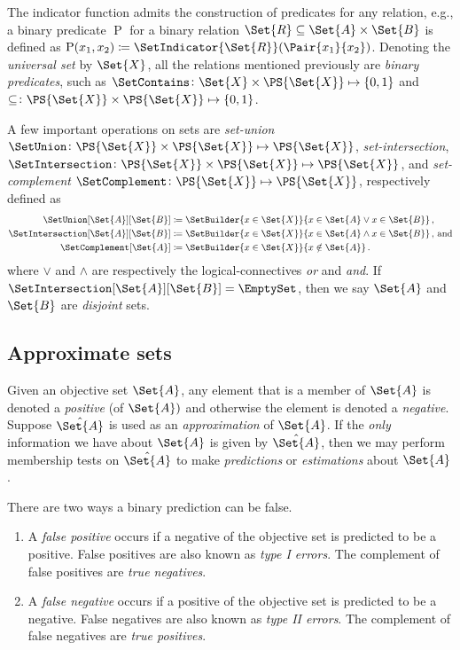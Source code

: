 \documentclass[../main.tex]{subfiles}
\begin{document}
The indicator function admits the construction of predicates for any relation, e.g., a binary predicate $\operatorname{P}$ for a binary relation $\Set{R} \subseteq \Set{A} \times \Set{B}$ is defined as $\operatorname{P}(x_1,x_2) \coloneqq \SetIndicator{\Set{R}}(\Pair{x_1}{x_2})$.
Denoting the \emph{universal set} by $\Set{X}$, all the relations mentioned previously are \emph{binary predicates}, such as $\SetContains \colon \Set{X} \times \PS{\Set{X}} \mapsto \{0,1\}$ and $\subseteq \colon \PS{\Set{X}} \times \PS{\Set{X}} \mapsto \{0,1\}$.

A few important operations on sets are \emph{set-union} $\SetUnion \colon \PS{\Set{X}} \times \PS{\Set{X}} \mapsto \PS{\Set{X}}$, \emph{set-intersection}, $\SetIntersection \colon \PS{\Set{X}} \times \PS{\Set{X}} \mapsto \PS{\Set{X}}$, and \emph{set-complement} $\SetComplement \colon \PS{\Set{X}} \mapsto \PS{\Set{X}}$, respectively defined as
\begin{align}
	\SetUnion[\Set{A}][\Set{B}]			&\coloneqq \SetBuilder{ x \in \Set{X}}{x \in \Set{A} \lor x \in \Set{B}}\,,\\
	\SetIntersection[\Set{A}][\Set{B}]	&\coloneqq \SetBuilder{ x \in \Set{X}}{x \in \Set{A} \land x \in \Set{B}}\,,\,\text{and}\\
	\SetComplement[\Set{A}]				&\coloneqq \SetBuilder{ x \in \Set{X}}{x \notin \Set{A}}\,.
\end{align}
where $\lor$ and $\land$ are respectively the logical-connectives \emph{or} and \emph{and}.
If $\SetIntersection[\Set{A}][\Set{B}] = \EmptySet$, then we say $\Set{A}$ and $\Set{B}$ are \emph{disjoint} sets.

\subsection{Approximate sets}
\label{sec:asets}
Given an objective set $\Set{A}$, any element that is a member of $\Set{A}$ is denoted a \emph{positive} (of $\Set{A})$ and otherwise the element is denoted a \emph{negative}.
Suppose $\hat{\Set{A}}$ is used as an \emph{approximation} of $\Set{A}$.
If the \emph{only} information we have about $\Set{A}$ is given by $\hat{\Set{A}}$, then we may perform membership tests on $\hat{\Set{A}}$ to make \emph{predictions} or \emph{estimations} about $\Set{A}$.

There are two ways a binary prediction can be false.
\begin{enumerate}
	\item A \emph{false positive} occurs if a negative of the objective set is predicted to be a positive. False positives are also known as \emph{type I errors}.
	The complement of false positives are \emph{true negatives}.
	\item A \emph{false negative} occurs if a positive of the objective set is predicted to be a negative. False negatives are also known as \emph{type II errors}.
	The complement of false negatives are \emph{true positives}.
\end{enumerate} 
\end{document}
